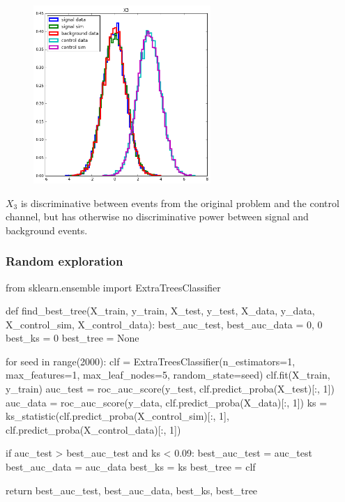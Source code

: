 \documentclass{beamer}
\begin{document}
\begin{frame}

\begin{figure}
\centering
\includegraphics[width=0.6\textwidth]{x3.png}
\end{figure}

$X_3$ is discriminative between events from the original problem and the
control channel, but has otherwise no discriminative power between signal and
background events.

\end{frame}

\begin{frame}[fragile]
  \frametitle{Random exploration}

{\scriptsize
\begin{pythoncode}
from sklearn.ensemble import ExtraTreesClassifier

def find_best_tree(X_train, y_train, X_test, y_test,
                   X_data, y_data, X_control_sim, X_control_data):
    best_auc_test, best_auc_data = 0, 0
    best_ks = 0
    best_tree = None

    for seed in range(2000):
        clf = ExtraTreesClassifier(n_estimators=1, max_features=1,
                                   max_leaf_nodes=5, random_state=seed)
        clf.fit(X_train, y_train)
        auc_test = roc_auc_score(y_test, clf.predict_proba(X_test)[:, 1])
        auc_data = roc_auc_score(y_data, clf.predict_proba(X_data)[:, 1])
        ks = ks_statistic(clf.predict_proba(X_control_sim)[:, 1],
                          clf.predict_proba(X_control_data)[:, 1])

        if auc_test > best_auc_test and ks < 0.09:
            best_auc_test = auc_test
            best_auc_data = auc_data
            best_ks = ks
            best_tree = clf

    return best_auc_test, best_auc_data, best_ks, best_tree
\end{pythoncode}
}

\end{frame}
\end{document}

